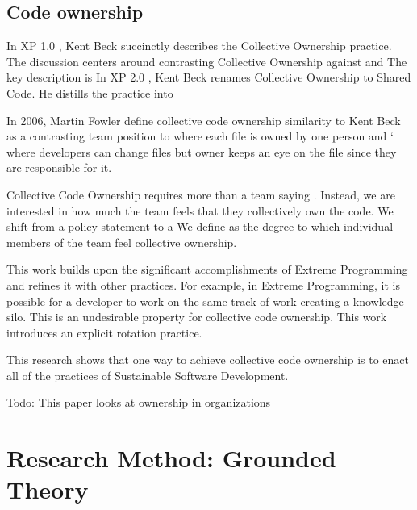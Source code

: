 \subsection{Code ownership}
In XP 1.0 \cite{ExtremeProgramming2000}, Kent Beck succinctly describes the Collective Ownership practice. The discussion centers around contrasting Collective Ownership against  and  The key description is  In XP 2.0 \cite{ExtremeProgramming2004}, Kent Beck renames Collective Ownership to Shared Code. He distills the practice into  

In 2006, Martin Fowler define collective code ownership similarity to Kent Beck \cite{FowlerCodeOwnership} as a contrasting team position to  where each file is owned by one person and ` where developers can change files but owner keeps an eye on the file since they are responsible for it. 

Collective Code Ownership requires more than a team saying . Instead, we are interested in how much the team feels that they collectively own the code. We shift from a policy statement to a  We define  as the degree to which individual members of the team feel collective ownership.  

This work builds upon the significant accomplishments of Extreme Programming and refines it with other practices. For example, in Extreme Programming, it is possible for a developer to work on the same track of work creating a knowledge silo. This is an undesirable property for collective code ownership. This work introduces an explicit rotation practice.

This research shows that one way to achieve collective code ownership is to enact all of the practices of Sustainable Software Development.

Todo: This paper looks at ownership in organizations \cite{PierceOwnershipInOrganizations}
\section{Research Method: Grounded Theory}
\label{ResearchMethod}

